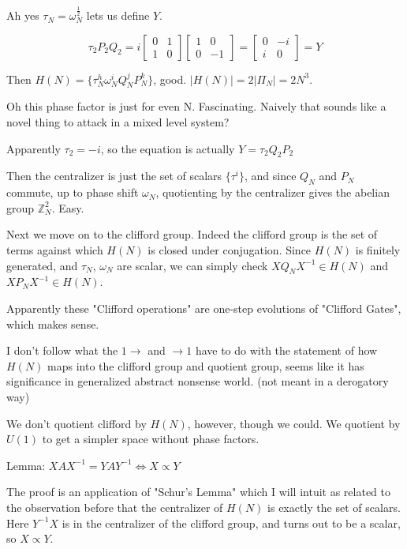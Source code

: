 \documentclass[]{article}
\newcommand{\ord}[1]{\left| #1 \right|}
\begin{document}
Ah yes $\tau_N = \omega_N^{\frac{1}{2}}$ lets us define $Y$.

\[\tau_2P_2Q_2 = i
\left[\begin{matrix}
0 & 1 \\
1 & 0
\end{matrix}\right]
\left[\begin{matrix}
1 & 0 \\
0 & -1
\end{matrix}\right]
=
\left[\begin{matrix}
	0 & -i \\
	i & 0
\end{matrix}\right]
= Y\]

Then $H(N) = \{\tau_N^h\omega_N^i Q_N^j P_N^k\}$, good. $\ord{H(N)}=2\ord{\Pi_N}=2N^3$.

Oh this phase factor is just for even N. Fascinating. Naively that sounds like a novel thing to attack in a mixed level system?

Apparently $\tau_2 = -i$, so the equation is actually $Y = \tau_2 Q_2 P_2$

Then the centralizer is just the set of scalars $\{\tau^i\}$, and since $Q_N$ and $P_N$ commute, up to phase shift $\omega_N$, quotienting by the centralizer gives the abelian group $\mathbb{Z}_N^2$. Easy.

Next we move on to the clifford group.
Indeed the clifford group is the set of terms against which $H(N)$ is closed under conjugation. Since $H(N)$ is finitely generated, and $\tau_N$, $\omega_N$ are scalar, we can simply check $XQ_NX^{-1} \in H(N)$ and $XP_NX^{-1} \in H(N)$.

Apparently these "Clifford operations" are one-step evolutions of "Clifford Gates", which makes sense.

I don't follow what the $1 \to$ and $\to 1$ have to do with the statement of how $H(N)$ maps into the clifford group and quotient group, seems like it has significance in generalized abstract nonsense world. (not meant in a derogatory way)

We don't quotient clifford by $H(N)$, however, though we could. We quotient by $U(1)$ to get a simpler space without phase factors.

Lemma: $XAX^{-1} = YAY^{-1} \iff X \propto Y$

The proof is an application of "Schur's Lemma" which I will intuit as related to the observation before that the centralizer of $H(N)$ is exactly the set of scalars. Here $Y^{-1}X$ is in the centralizer of the clifford group, and turns out to be a scalar, so $X \propto Y$.
\end{document}
